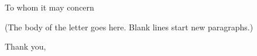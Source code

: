 \documentclass{ucbletter}
\begin{document}
\address{R.\ N.\ Slaybaugh\\Department of Nuclear Engineering\\4173 Etcheverry Hall\\Berkeley, California 94720-1731}
%
\signature{Rachel Slaybaugh}
\begin{letter}{}
\opening{To whom it may concern}

(The body of the letter goes here.  Blank lines start new paragraphs.)
\closing{Thank you,}
\end{letter}
\end{document}
